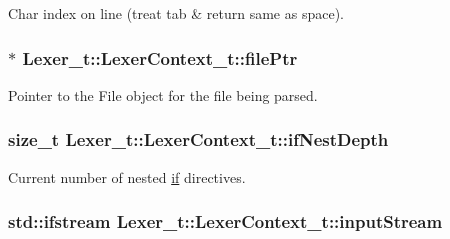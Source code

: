 Char index on line (treat tab \& return same as space). 

\subsubsection[{\texorpdfstring{file\+Ptr}{filePtr}}]{$\ast$ Lexer\+\_\+t\+::\+Lexer\+Context\+\_\+t\+::file\+Ptr}\hypertarget{struct_lexer__t_1_1_lexer_context__t_a7a7490749571aad6a55775e2f3e11b64}{}\label{struct_lexer__t_1_1_lexer_context__t_a7a7490749571aad6a55775e2f3e11b64}


Pointer to the File object for the file being parsed. 

\subsubsection[{\texorpdfstring{if\+Nest\+Depth}{ifNestDepth}}]{\setlength{\rightskip}{0pt plus 5cm}size\+\_\+t Lexer\+\_\+t\+::\+Lexer\+Context\+\_\+t\+::if\+Nest\+Depth}\hypertarget{struct_lexer__t_1_1_lexer_context__t_a0854c5341f96ad63b3462814671eabd6}{}\label{struct_lexer__t_1_1_lexer_context__t_a0854c5341f96ad63b3462814671eabd6}


Current number of nested \hyperlink{wifi_web_ap_8c_a2bf420bda7cb80e4552dcff350cddbef}{if} directives. 

\subsubsection[{\texorpdfstring{input\+Stream}{inputStream}}]{\setlength{\rightskip}{0pt plus 5cm}std\+::ifstream Lexer\+\_\+t\+::\+Lexer\+Context\+\_\+t\+::input\+Stream}\hypertarget{struct_lexer__t_1_1_lexer_context__t_a767eb84f0dd562f663f299ac8e8f05e2}{}\label{struct_lexer__t_1_1_lexer_context__t_a767eb84f0dd562f663f299ac8e8f05e2}


